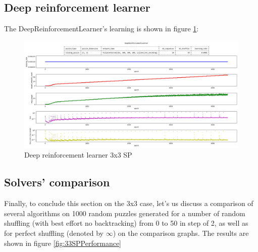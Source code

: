 \subsection{Deep reinforcement learner}
 The DeepReinforcementLearner's learning is shown in figure \ref{fig:33SPDeepReinforcementLearning}:

\begin{landscape}
\centering\vspace*{\fill}
\begin{figure}[H]
\centering
\includegraphics[align=c, scale=0.55]{./Figures/33SPDeepReinforcementLearning.jpeg}
\caption[33SPDeepReinforcementLearning]{Deep reinforcement learner 3x3 SP}
\label{fig:33SPDeepReinforcementLearning}
\end{figure}
\vfill
\end{landscape}
\restoregeometry


\subsection{Solvers' comparison}
Finally, to conclude this section on the 3x3 case, let's us discuss a comparison of several algorithms on 1000 random puzzles generated for a number of random shuffling (with best effort no backtracking) from 0 to 50 in step of 2, as well as for perfect shuffling (denoted by $\infty$) on the comparison graphs. The results are shown in figure \ref{fig:33SPPerformance}

